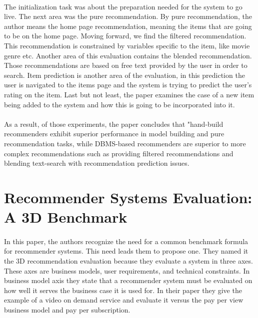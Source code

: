 \paragraph{}The initialization task was about the preparation needed for the system to go live. The next area was the pure recommendation. By pure recommendation, the author means the home page recommendation, meaning the items that are going to be on the home page. Moving forward, we find the filtered recommendation. This recommendation is constrained by variables specific to the item, like movie genre etc. Another area of this evaluation contains the blended recommendation. Those recommendations are based on free text provided by the user in order to search. Item prediction is another area of the evaluation, in this prediction the user is navigated to the items page and the system is trying to predict the user's rating on the item. Last but not least, the paper examines the case of a new item being added to the system and how this is going to be incorporated into it.

\paragraph{}As a result, of those experiments, the paper concludes that "hand-build recommenders exhibit superior performance in model building and pure recommendation tasks, while DBMS-based recommenders are superior to more complex recommendations such as providing filtered recommendations and blending text-search with recommendation prediction issues.

\section{Recommender Systems Evaluation: A 3D Benchmark \cite{said2012recommender}}
\paragraph{}In this paper, the authors recognize the need for a common benchmark formula for recommender systems. This need leads them to propose one. They named it the 3D recommendation evaluation because they evaluate a system in three axes. These axes are business models, user requirements, and technical constraints. In business model axis they state that a recommender system must be evaluated on how well it serves the business case it is used for. In their paper they give the example of a video on demand service and evaluate it versus the pay per view business model and pay per subscription.

